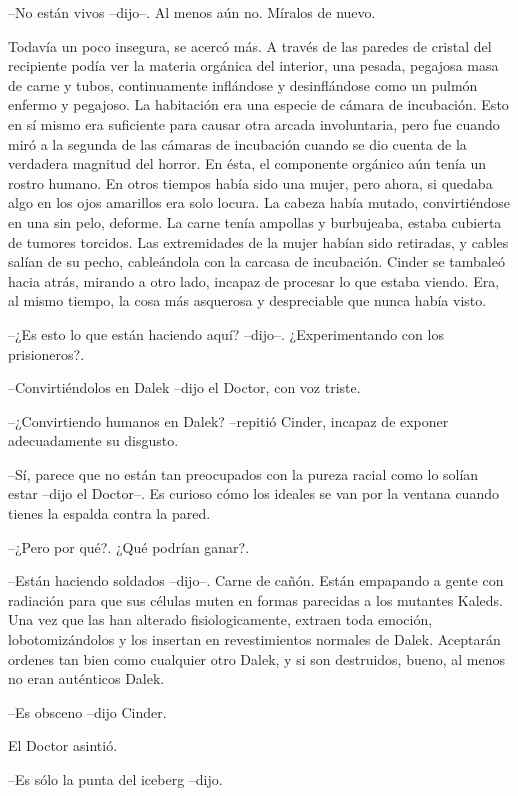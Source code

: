 --No están vivos --dijo--. Al menos aún no. Míralos de nuevo.
 
Todavía un poco insegura, se acercó más. A través de las paredes de cristal del recipiente podía ver la materia orgánica del interior, una pesada, pegajosa masa de carne y tubos, continuamente inflándose y desinflándose como un pulmón enfermo y pegajoso. La habitación era una especie de cámara de incubación.
Esto en sí mismo era suficiente para causar otra arcada involuntaria, pero fue cuando miró a la segunda de las cámaras de incubación cuando se dio cuenta de la verdadera magnitud del horror. En ésta, el componente orgánico aún tenía un rostro humano.
En otros tiempos había sido una mujer, pero ahora, si quedaba algo en los ojos amarillos era solo locura. La cabeza había mutado, convirtiéndose en una sin pelo, deforme. La carne tenía ampollas y burbujeaba, estaba cubierta de tumores torcidos. Las extremidades de la mujer habían sido retiradas, y cables salían de su pecho, cableándola con la carcasa de incubación.
Cinder se tambaleó hacia atrás, mirando a otro lado, incapaz de procesar lo que estaba viendo. Era, al mismo tiempo, la cosa más asquerosa y despreciable que nunca había visto.

--¿Es esto lo que están haciendo aquí? --dijo--. ¿Experimentando con los prisioneros?. 

--Convirtiéndolos en Dalek --dijo el Doctor, con voz triste.

--¿Convirtiendo humanos en Dalek? --repitió Cinder, incapaz de exponer adecuadamente su disgusto. 

--Sí, parece que no están tan preocupados con la pureza racial como lo solían estar --dijo el Doctor--. Es curioso cómo los ideales se van por la ventana cuando tienes la espalda contra la pared.

--¿Pero por qué?. ¿Qué podrían ganar?.

--Están haciendo soldados --dijo--. Carne de cañón. Están empapando a gente con radiación para que sus células muten en formas parecidas a los mutantes Kaleds. Una vez que las han alterado fisiologicamente, extraen toda emoción, lobotomizándolos y los insertan en revestimientos normales de Dalek. Aceptarán ordenes tan bien como cualquier otro Dalek, y si son destruidos, bueno, al menos no eran auténticos Dalek.

--Es obsceno --dijo Cinder.

El Doctor asintió. 

--Es sólo la punta del iceberg --dijo.

